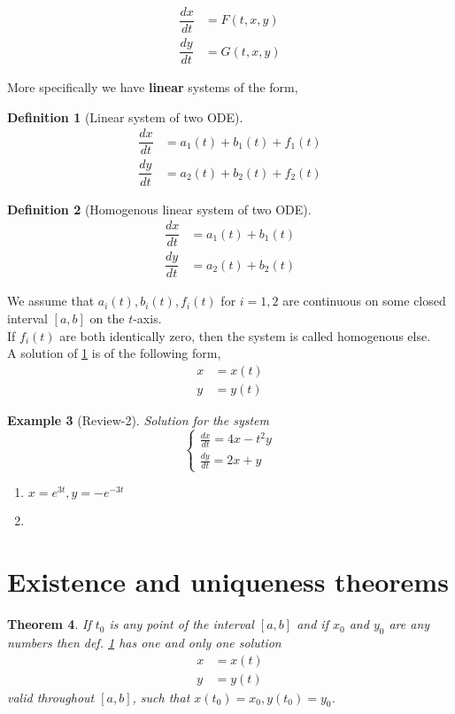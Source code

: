 \documentclass[oneside,11pt,pdftex,final]{book}%
\numberwithin{equation}{section}
\newtheorem{theorem}{Theorem}[chapter]%
\newtheorem{example}[theorem]{Example}
\newtheorem{definition}[theorem]{Definition}
\numberwithin{section}{chapter}
\numberwithin{equation}{chapter}
\begin{document}
\begin{align*}
	\dfrac{dx}{dt}&=F(t,x,y)\\
	\dfrac{dy}{dt}&=G(t,x,y)
\end{align*}


More specifically we have \textbf{linear} systems of the form,

\begin{definition}[Linear system of two ODE]\label{def:syslinear}
	\begin{align*}
		\dfrac{dx}{dt}&=a_1(t)+b_1(t)+f_1(t)\\
		\dfrac{dy}{dt}&=a_2(t)+b_2(t)+f_2(t)
	\end{align*}
\end{definition}


\begin{definition}[Homogenous linear system of two ODE]\label{def:homosyslinear}
	\begin{align*}
		\dfrac{dx}{dt}&=a_1(t)+b_1(t)\\
		\dfrac{dy}{dt}&=a_2(t)+b_2(t)
	\end{align*} 
\end{definition}


We assume that $ a_i(t),b_i(t),f_i(t) $ for $ i=1,2 $ are continuous on some closed interval $ [a,b] $ on the $ t$-axis.\\
If $ f_i(t) $ are both identically zero, then the system is called homogenous else.
\\
A solution of \ref{def:syslinear} is of the following form,
\begin{align*}
	x&=x(t)\\
	y&=y(t)
\end{align*}

\begin{example}[Review-2]
	Solution for the system
	\[ \begin{cases}
		\frac{dx}{dt}=4x-t^2y\\
		\frac{dy}{dt}=2x+y
	\end{cases} \]
\begin{enumerate}
	\item $ x=e^{3t},y=-e^{-3t} $
	\item 
\end{enumerate}
\end{example}


\section{Existence and uniqueness theorems}
\begin{theorem}
	If $ t_0 $ is any point of the interval $ [a,b] $ and if $ x_0 $ and $ y_0 $ are any numbers then def. \ref{def:syslinear} has one and only one solution 
	\begin{align*}
		x&=x(t)\\
		y&=y(t)
	\end{align*}
valid throughout $ [a,b] $, such that $ x(t_0)=x_0, y(t_0)=y_0 $.
\end{theorem}
\end{document}
